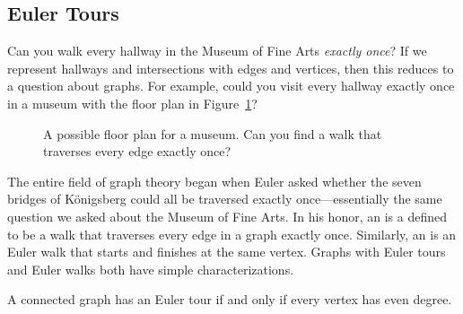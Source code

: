 \subsection{Euler Tours}

Can you walk every hallway in the Museum of Fine Arts \emph{exactly
  once}?  If we represent hallways and intersections with edges and
vertices, then this reduces to a question about graphs.  For example,
could you visit every hallway exactly once in a museum with the
floor plan in Figure~\ref{fig:5BC}?

\begin{figure}



\caption{A possible floor plan for a museum. Can you find a walk that
  traverses every edge exactly once?}

\label{fig:5BC}

\end{figure}

The entire field of graph theory began when Euler asked whether the
seven bridges of K\"onigsberg could all be traversed exactly
once---essentially the same question we asked about the Museum of Fine
Arts.  In his honor, an  is a defined to be a walk
that traverses every edge in a graph exactly once.  Similarly, an
 is an Euler walk that starts and finishes at the
same vertex.  Graphs with Euler tours and Euler walks both have simple
characterizations.
\begin{theorem}\label{thm:euler-tour}
A connected graph has an Euler tour if and only if every vertex has
even degree.
\end{theorem}

